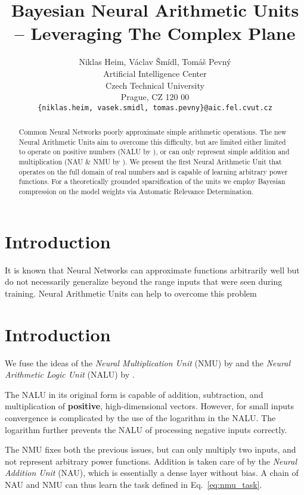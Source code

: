 \documentclass[9pt]{article}
\title{Bayesian Neural Arithmetic Units -- Leveraging The Complex Plane}
\author{
  Niklas Heim,
  V\'aclav \v Sm\'idl,
  Tom\'a\v s Pevn\'y \\
  Artificial Intelligence Center\\
  Czech Technical University\\
  Prague, CZ 120 00\\
  \texttt{\{niklas.heim, vasek.smidl, tomas.pevny\}@aic.fel.cvut.cz}\\
}
\begin{document}
\maketitle

\begin{abstract}
  Common Neural Networks poorly approximate simple arithmetic operations.  The
  new Neural Arithmetic Units aim to overcome this difficulty, but are limited
  either limited to operate on positive numbers (NALU by
  \citet{trask_neural_2018}), or can only represent simple addition and
  multiplication (NAU & NMU by \citet{madsen_neural_2020}).
  We present the first Neural Arithmetic Unit that operates on the full domain
  of real numbers and is capable of learning arbitrary power functions.
  For a theoretically grounded sparsification of the units we employ Bayesian
  compression on the model weights via Automatic Relevance Determination.
\end{abstract}

\section{Introduction}%
\label{sec:introduction}

It is known that Neural Networks can approximate functions arbitrarily well but
do not necessarily generalize beyond the range inputs that were seen during
training. Neural Arithmetic Units can help to overcome this problem
\cite{trask_neural_2018,madsen_neural_2020}


\section{Introduction}%
\label{sec:introduction}

We fuse the ideas of the \emph{Neural Multiplication Unit} (NMU) by
\citet{madsen_neural_2020} and the \emph{Neural Arithmetic Logic Unit} (NALU)
by \citet{trask_neural_2018}.

The NALU in its original form is capable of addition, subtraction, and
multiplication of \textbf{positive}, high-dimensional vectors. However, for
small inputs convergence is complicated by the use of the logarithm in the
NALU. The logarithm further prevents the NALU of processing negative inputs
correctly.

The NMU fixes both the previous issues, but can only multiply two inputs, and
not represent arbitrary power functions.  Addition is taken care of by the
\emph{Neural Addition Unit} (NAU), which is essentially a dense layer without
bias. A chain of NAU and NMU can thus learn the task defined in
Eq.~\ref{eq:nmu_task}.
\end{document}
